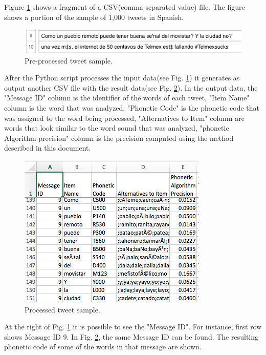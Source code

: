 \documentclass[9pt,conference]{IEEEtran}
\begin{document}
Figure \ref{fig:preprocessed_tweet} shows a fragment of a CSV(comma separated 
value) file. The figure shows a portion of the sample of 1,000 tweets in Spanish.
\begin{figure}[H]
    \centering
    \includegraphics[width=\columnwidth]{results_01_20161024}
    \caption{Pre-processed tweet sample.}
    \label{fig:preprocessed_tweet}
\end{figure}

After the Python script processes the input data(see Fig. \ref{fig:preprocessed_tweet}) it 
generates as output another CSV file with the result data(see Fig. \ref{fig:processed_tweet}).
In the output data, the "Message ID" column is the identifier of the words of each tweet, 
"Item Name" column is the word that was analyzed, "Phonetic Code" is the phonetic 
code that was assigned to the word being processed, "Alternatives to Item" column are 
words that look similar to the word sound that was analyzed, "phonetic Algorithm precision" 
column is the precision computed using the method described in this document.
\begin{figure}[H]
    \centering
    \includegraphics[width=0.8\columnwidth]{results_02_20161024}
    \caption{Processed tweet sample.}
    \label{fig:processed_tweet}
\end{figure}

At the right of Fig. \ref{fig:preprocessed_tweet} it is possible to see the "Message ID". For
instance, first row shows Message ID 9. In Fig. \ref{fig:processed_tweet}, the same Message
ID can be found. The resulting phonetic code of some of the words in that message
are shown. \\
\end{document}
